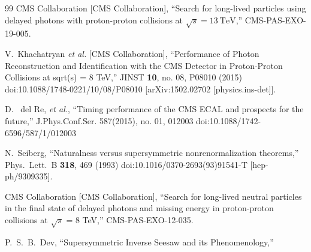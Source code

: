 \begin{thebibliography}{99}
  CMS Collaboration [CMS Collaboration],
  ``Search for long-lived particles using delayed photons with proton-proton collisions at $\sqrt{s}=13~\mathrm{TeV}$,''
  CMS-PAS-EXO-19-005.
  
  V.~Khachatryan {\it et al.} [CMS Collaboration],
  ``Performance of Photon Reconstruction and Identification with the CMS Detector in Proton-Proton Collisions at sqrt(s) = 8 TeV,''
  JINST {\bf 10}, no. 08, P08010 (2015)
  doi:10.1088/1748-0221/10/08/P08010
  [arXiv:1502.02702 [physics.ins-det]].
  
  
  D. ~del Re, {\it et al.},
  ``Timing performance of the CMS ECAL and prospects for the future,''
  J.Phys.Conf.Ser. 587(2015), no. 01, 012003
  doi:10.1088/1742-6596/587/1/012003
  
  N.~Seiberg,
  ``Naturalness versus supersymmetric nonrenormalization theorems,''
  Phys.\ Lett.\ B {\bf 318}, 469 (1993)
  doi:10.1016/0370-2693(93)91541-T
  [hep-ph/9309335].
  
  CMS Collaboration [CMS Collaboration],
  ``Search for long-lived neutral particles in the final state of delayed photons and missing energy in proton-proton collisions at $\sqrt s$ = 8 TeV,''
  CMS-PAS-EXO-12-035.
 
  P.~S.~B.~Dev,
  ``Supersymmetric Inverse Seesaw and its Phenomenology,''
 
  
\end{thebibliography}


